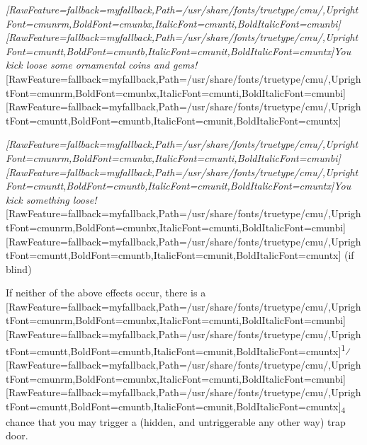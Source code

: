 \begin{myitemize}\item{}{\itshape \allowbreak{}\setmainfont{cmunti.ttf}[RawFeature={fallback=myfallback},Path=/usr/share/fonts/truetype/cmu/,UprightFont=cmunrm,BoldFont=cmunbx,ItalicFont=cmunti,BoldItalicFont=cmunbi]\setmonofont{cmunti.ttf}[RawFeature={fallback=myfallback},Path=/usr/share/fonts/truetype/cmu/,UprightFont=cmuntt,BoldFont=cmuntb,ItalicFont=cmunit,BoldItalicFont=cmuntx]\itshape {}You kick loose some ornamental coins and gems!}\allowbreak{}\setmainfont{cmunrm.ttf}[RawFeature={fallback=myfallback},Path=/usr/share/fonts/truetype/cmu/,UprightFont=cmunrm,BoldFont=cmunbx,ItalicFont=cmunti,BoldItalicFont=cmunbi]\setmonofont{cmunrm.ttf}[RawFeature={fallback=myfallback},Path=/usr/share/fonts/truetype/cmu/,UprightFont=cmuntt,BoldFont=cmuntb,ItalicFont=cmunit,BoldItalicFont=cmuntx]
\item{}{\itshape \allowbreak{}\setmainfont{cmunti.ttf}[RawFeature={fallback=myfallback},Path=/usr/share/fonts/truetype/cmu/,UprightFont=cmunrm,BoldFont=cmunbx,ItalicFont=cmunti,BoldItalicFont=cmunbi]\setmonofont{cmunti.ttf}[RawFeature={fallback=myfallback},Path=/usr/share/fonts/truetype/cmu/,UprightFont=cmuntt,BoldFont=cmuntb,ItalicFont=cmunit,BoldItalicFont=cmuntx]\itshape {}You kick something loose!}{$\text{ }$}\allowbreak{}\setmainfont{cmunrm.ttf}[RawFeature={fallback=myfallback},Path=/usr/share/fonts/truetype/cmu/,UprightFont=cmunrm,BoldFont=cmunbx,ItalicFont=cmunti,BoldItalicFont=cmunbi]\setmonofont{cmunrm.ttf}[RawFeature={fallback=myfallback},Path=/usr/share/fonts/truetype/cmu/,UprightFont=cmuntt,BoldFont=cmuntb,ItalicFont=cmunit,BoldItalicFont=cmuntx] (if blind)
\end{myitemize}

If neither of the above effects occur, there is a \allowbreak{}\setmainfont{cmunrm.ttf}[RawFeature={fallback=myfallback},Path=/usr/share/fonts/truetype/cmu/,UprightFont=cmunrm,BoldFont=cmunbx,ItalicFont=cmunti,BoldItalicFont=cmunbi]\setmonofont{cmunrm.ttf}[RawFeature={fallback=myfallback},Path=/usr/share/fonts/truetype/cmu/,UprightFont=cmuntt,BoldFont=cmuntb,ItalicFont=cmunit,BoldItalicFont=cmuntx]\textsuperscript{1}⁄\allowbreak{}\setmainfont{cmunrm.ttf}[RawFeature={fallback=myfallback},Path=/usr/share/fonts/truetype/cmu/,UprightFont=cmunrm,BoldFont=cmunbx,ItalicFont=cmunti,BoldItalicFont=cmunbi]\setmonofont{cmunrm.ttf}[RawFeature={fallback=myfallback},Path=/usr/share/fonts/truetype/cmu/,UprightFont=cmuntt,BoldFont=cmuntb,ItalicFont=cmunit,BoldItalicFont=cmuntx]\textsubscript{4} chance that you may trigger a (hidden, and untriggerable any other way) trap door\footnotemark[94].




